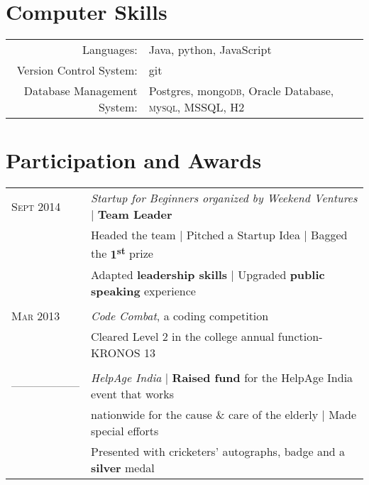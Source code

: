 \documentclass[a4paper,10pt]{article} %
\begin{document}

\section{Computer Skills}

\begin{tabular}{rl}
Languages: & Java, python, JavaScript\\

Version Control System: & git\\

Database Management System: & Postgres, mongo\textsc{db}, Oracle Database, \textsc{m}y\textsc{sql}, \textsc{MSSQL}, \textsc{H}2
\end{tabular}


\section{Participation and Awards}

\begin{tabular}{ll}
\textsc{Sept} 2014 & \emph{Startup for Beginners organized by Weekend Ventures} | \textbf{Team Leader}\\
& Headed the team | Pitched a Startup Idea | Bagged the \textbf{1\textsuperscript{st}} prize\\
& Adapted \textbf{leadership skills} | Upgraded \textbf{public speaking} experience\\
&\\


\textsc{Mar} 2013 & \emph{Code Combat}, a coding competition\\
& Cleared Level 2 in the college annual function- KRONOS 13\\
&\\


\textsc{------------------} & \emph{HelpAge India} | \textbf{Raised fund} for the HelpAge India event that works\\
& nationwide for the cause \& care of the elderly | Made special efforts\\
& Presented with cricketers' autographs, badge and a \textbf{silver} medal
\end{tabular}
\end{document}
